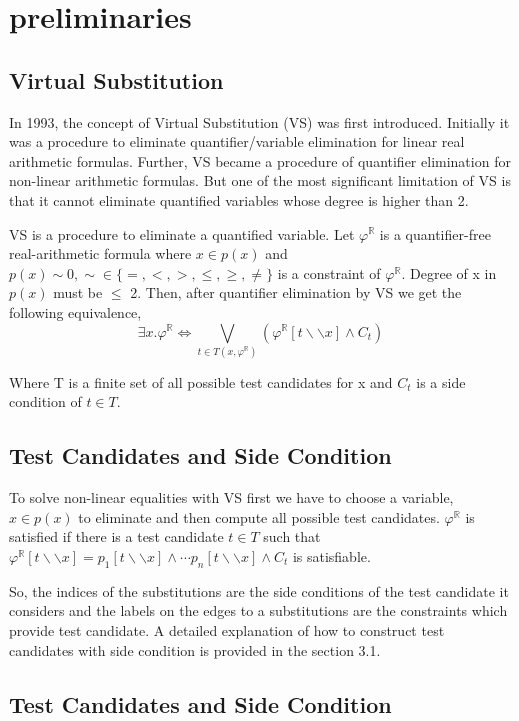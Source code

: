 \section{preliminaries}
\label{sec:background}
\subsection{Virtual Substitution}
	In 1993, the concept of Virtual Substitution (VS) was first introduced. Initially it was a procedure to eliminate quantifier/variable elimination for linear real arithmetic formulas. Further, VS became a procedure of quantifier elimination for non-linear arithmetic formulas. But one of the most significant limitation of VS is that it cannot eliminate quantified variables whose degree is higher than 2.
	
	VS is a procedure to eliminate a quantified variable. Let $\varphi^\mathbb{R}$ is a quantifier-free real-arithmetic formula where $x\in p(x)$ and $p(x) \sim 0, \sim \in \{=,<,>,\leq,\geq,\neq\}$ is a constraint of   $\varphi^\mathbb{R}$. Degree of x in $p(x)$ must be $\leq$ 2. Then, after quantifier elimination by VS we get the following equivalence,
	$$ \exists x. \varphi^\mathbb{R} \Longleftrightarrow \bigvee\limits_{t\in T(x,\varphi^\mathbb{R})}  (\varphi^\mathbb{R} [t\backslash\backslash x] \wedge C_t)$$
	
	Where T is a finite set of all possible test candidates for x and $C_t$ is a side condition of $t \in T$.
\subsection{Test Candidates and Side Condition}
	To solve non-linear equalities with VS first we have to choose a variable, $x\in p(x)$ to eliminate and then compute all possible test candidates. $\varphi^\mathbb{R}$ is satisfied if there is a test candidate $t\in T$ such that $\varphi^\mathbb{R} [t\backslash\backslash x] = p_1[t\backslash\backslash x] \wedge \cdots p_n[t\backslash\backslash x] \wedge C_t$ is satisfiable.
	
	So, the indices of the substitutions are the side conditions of the test candidate it considers and the labels on the edges to a substitutions are the constraints which provide test candidate. A detailed explanation of how to construct test candidates with side condition is provided in the section 3.1.
\subsection{Test Candidates and Side Condition}
	
	
